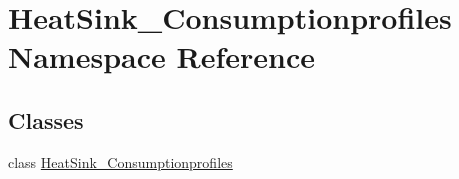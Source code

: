 \hypertarget{namespace_heat_sink___consumptionprofiles}{}\section{Heat\+Sink\+\_\+\+Consumptionprofiles Namespace Reference}
\label{namespace_heat_sink___consumptionprofiles}
\subsection*{Classes}
\begin{DoxyCompactItemize}
\item 
class \hyperlink{class_heat_sink___consumptionprofiles_1_1_heat_sink___consumptionprofiles}{Heat\+Sink\+\_\+\+Consumptionprofiles}
\end{DoxyCompactItemize}
